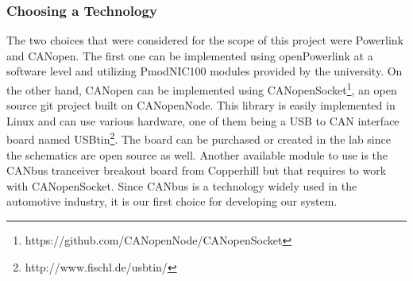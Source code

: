 \subsubsection{Choosing a Technology}
The two choices that were considered for the scope of this project were Powerlink and CANopen. The first one can be implemented using openPowerlink at a software level and utilizing PmodNIC100 modules provided by the university. On the other hand, CANopen can be implemented using CANopenSocket\footnote{https://github.com/CANopenNode/CANopenSocket}, an open source git project built on CANopenNode. This library is easily implemented in Linux and can use various hardware, one of them being a USB to CAN interface board named USBtin\footnote{http://www.fischl.de/usbtin/}. The board can be purchased or created in the lab since the schematics are open source as well. Another available module to use is the CANbus tranceiver breakout board from Copperhill but that requires to work with CANopenSocket. Since CANbus is a technology widely used in the automotive industry, it is our first choice for developing our system.



